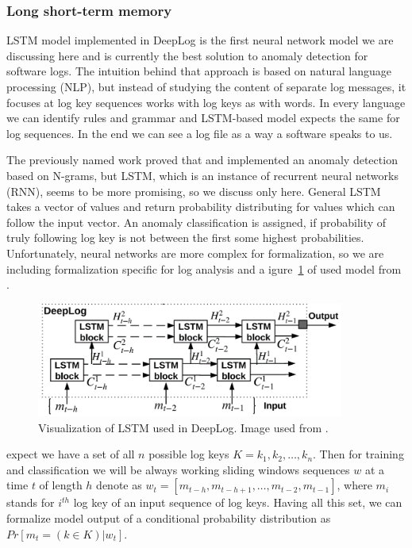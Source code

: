 \subsubsection{Long short-term memory}

LSTM \cite{hochreiter1997long} model implemented in DeepLog \cite{du2017deeplog} is the first neural network model we are discussing here and is currently the best solution to anomaly detection for software logs.  The intuition behind that approach is based on natural language processing (NLP), but instead of studying the content of separate log messages, it focuses at log key sequences works  with log keys as with words. In every language we can identify rules and grammar and LSTM-based model expects the same for log sequences. In the end we can see a log file as a way a software speaks to us.

The previously named work proved that and implemented an anomaly detection based on N-grams, but LSTM, which is an instance of recurrent neural networks (RNN), seems to be more promising, so we discuss only  here. General LSTM takes a vector of values and return probability distributing for values which can follow the input vector. An anomaly classification is assigned, if probability of truly following log key is not between the first some highest probabilities. Unfortunately, neural networks are more complex for formalization, so we are including formalization specific for log analysis and a igure~\ref{fig:sota_lstm_deeplog} of used model from \cite{du2017deeplog}.

\begin{figure}[h]
    \centering
    \includegraphics[width=0.9\textwidth]{figures/stateOfTheArt/deepLogLSTM.png}
    \caption{Visualization of LSTM used in DeepLog. Image used from \cite{du2017deeplog}.}
    \label{fig:sota_lstm_deeplog}
\end{figure}

 expect we have a set of all $n$ possible log keys $K={ k_{1}, k_{2}, … , k_{n}}$. Then for training and classification we will be always working sliding windows sequences $w$ at a time $t$ of length $h$ denote as $ w_{t} = [m_{t-h}, m_{t-h+1}, … , m_{t-2}, m_{t-1}]$, where $m_{i}$ stands for $i^{th}$ log key of an input sequence of log keys. Having all this set, we can formalize model output of a conditional probability distribution as $Pr[m_{t} = (k \in K) |w_{t} ]$. 

